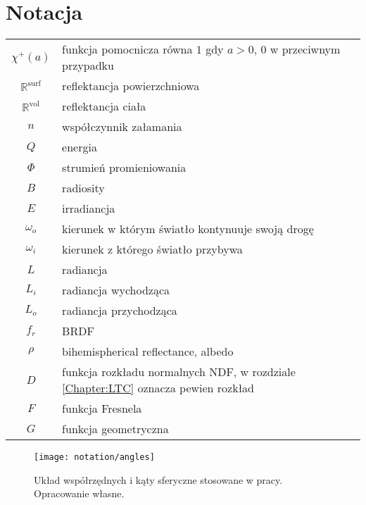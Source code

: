 \documentclass[../main.tex]{subfiles}
\begin{document}
\chapter*{Notacja}

\begin{tabularx}{\textwidth}{cl}
  $\chi^{+}(a)$ 
  & funkcja pomocnicza równa $1$ gdy $a>0$, 0 w przeciwnym przypadku \\
  
  $\mathbb{R}^{\text{surf}}$
  & reflektancja powierzchniowa \\
  
  $\mathbb{R}^{\text{vol}}$
  & reflektancja ciała \\
  
  $n$
  & współczynnik załamania \\
  
  $Q$
  & energia \\
  
  $\Phi$ 
  & strumień promieniowania \\
  
  $B$
  & radiosity \\
  
  $E$
  & irradiancja \\
  
  $\omega_o$
  & kierunek w którym światło kontynuuje swoją drogę \\
  
  $\omega_i$
  & kierunek z którego światło przybywa \\
  
  $L$
  & radiancja \\
  
  $L_i$
  & radiancja wychodząca \\
  
  $L_o$
  & radiancja przychodząca \\
  
  $f_r$
  & BRDF \\
  
  $\rho$ 
  & bihemispherical reflectance, albedo \\
  
  $D$
  & funkcja rozkładu normalnych NDF, w rozdziale \ref{Chapter:LTC} oznacza pewien rozkład \\
  
  $F$
  & funkcja Fresnela \\
  
  $G$ 
  & funkcja geometryczna \\  
\end{tabularx}

\begin{figure}[h]
    \centering
    \texttt{[image: notation/angles]}
    \caption{Układ współrzędnych i kąty sferyczne stosowane w pracy. Opracowanie własne.}
    \label{fig:NotationAngles}
\end{figure}
\end{document}
